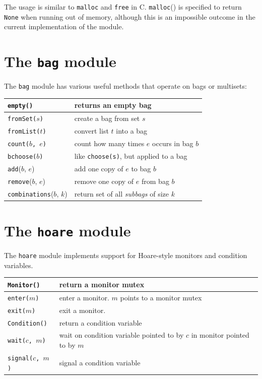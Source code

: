 \documentclass{report}
\begin{document}
The usage is similar to \texttt{malloc} and \texttt{free} in C.
\texttt{malloc}() is specified to return \texttt{None} when running out of
memory, although this is an impossible outcome in the current
implementation of the module.

\section{The \texttt{bag} module}
\label{ap:bag}

The \texttt{bag} module
%
has various useful methods that operate on bags or
multisets:

\vspace{1em}
\begin{tabular}{|l|l|}
\hline
\texttt{empty()} & returns an empty bag\\
\hline
\texttt{fromSet($s$)} & create a bag from set $s$\\
\hline
\texttt{fromList($t$)} & convert list $t$ into a bag \\
\hline
\texttt{count($b$, $e$)} & count how many times $e$ occurs in bag $b$\\
\hline
\texttt{bchoose($b$)} & like \texttt{choose(s)}, but applied to a bag\\
\hline
\texttt{add}($b$, $e$) & add one copy of $e$ to bag $b$ \\
\hline
\texttt{remove}($b$, $e$) & remove one copy of $e$ from bag $b$ \\
\hline
\texttt{combinations}($b$, $k$) & return set of all \emph{subbags} of size $k$ \\
\hline
\end{tabular}

\section{The \texttt{hoare} module}
\label{ap:hoare}

%
The \texttt{hoare} module implements support for Hoare-style monitors
and condition variables.

\vspace{1em}
\begin{tabular}{|l|l|}
\hline
\texttt{Monitor()} & return a monitor mutex\\
\hline
\texttt{enter($m$)} & enter a monitor.  $m$ points to a monitor mutex\\
\hline
\texttt{exit($m$)} & exit a monitor.\\
\hline
\texttt{Condition()} & return a condition variable\\
\hline
\texttt{wait($c$, $m$)} & wait on condition variable pointed to by $c$ in monitor pointed to by $m$\\
\hline
\texttt{signal($c$, $m$)} & signal a condition variable\\
\hline
\end{tabular}
\end{document}
